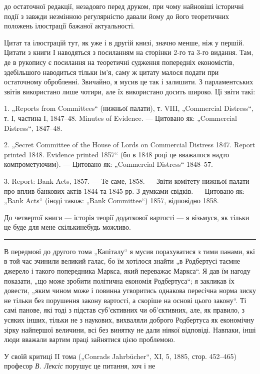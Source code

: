 \parcont{}  %
до остаточної редакції, незадовго перед друком, при чому найновіші
історичні події з завжди незмінною регулярністю давали
йому до його теоретичних положень ілюстрації бажаної актуальності.

Цитат та ілюстрацій тут, як уже і в другій книзі, значно
менше, ніж у першій. Цитати з книги І наводяться з посиланням
на сторінки 2-го та 3-го видання. Там, де в рукопису є
посилання на теоретичні судження попередніх економістів, здебільшого
наводиться тільки ім’я, саму ж цитату малося подати
при остаточному обробленні. Звичайно, я мусив це так і залишити.
З парламентських звітів використано лише чотири, але
їх використано досить широко. Ці звіти такі:

1. „Reports from Committees“ (нижньої палати), т. VIII, „Commercial
Distress“, т. І, частина І, 1847--48. Minutes of Evidence. —
Цитовано як: „Commercial Distress“, 1847--48.

2. „Secret Committee of the House of Lords on Commercial Distress
1847. Report printed 1848. Evidence printed 1857“ (бо в 1848 році
це вважалося надто компрометуючим). — Цитовано як: „Commercial
Distress“ 1848--57.

3. Report: Bank Acts, 1857. — Те саме, 1858. — Звіти комітету
нижньої палати про вплив банкових актів 1844 та 1845 рр.
З думками свідків. — Цитовано як: „Bank Acts“ (іноді також:
„Bank Committee“) 1857, відповідно 1858.

До четвертої книги — історія теорії додаткової вартості —
я візьмуся, як тільки це буде для мене скількинебудь можливо.

\pfbreak

В передмові до другого тома „Капіталу“ я мусив порахуватися
з тими панами, які в той час зчинили великий галас, бо
їм хотілося знайти „в Родбертусі таємне джерело і такого попередника
Маркса, який переважає Маркса“. Я дав їм нагоду
показати, „що може зробити політична економія Родбертуса“;
я закликав їх довести, „яким чином може і повинна утворитись
однакова пересічна норма зиску не тільки без порушення закону
вартості, а скоріше на основі цього закону“. Ті самі панове,
які тоді з підстав суб’єктивних чи об’єктивних, але, як правило,
з усяких інших, тільки не з наукових, вихваляли доброго Родбертуса
як економічну зірку найпершої величини, всі без винятку
не дали ніякої відповіді. Навпаки, інші люди вважали
вартим праці зайнятися цією проблемою.

У своїй критиці II тома („Conrads Jahrbücher“, XI, 5, 1885,
стор. 452--465) професор \emph{В. Лексіс} порушує це питання, хоч і не

\parbreak{}  %
